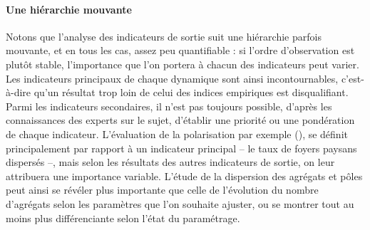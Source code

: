 \documentclass[12pt, a4paper, oneside]{book}
\begin{document}
	\paragraph{Une hiérarchie mouvante}
	Notons que l'analyse des indicateurs de sortie suit une hiérarchie parfois mouvante, et en tous les cas, assez peu quantifiable : si l'ordre d'observation est plutôt stable, l'importance que l'on portera à chacun des indicateurs peut varier.
	Les indicateurs principaux de chaque dynamique sont ainsi \og incontournables\fg{}, c'est-à-dire qu'un résultat trop loin de celui des indices empiriques est disqualifiant.
	Parmi les indicateurs secondaires, il n'est pas toujours possible, d'après les connaissances des experts sur le sujet, d'établir une priorité ou une pondération de chaque indicateur. L'évaluation de la polarisation par exemple (), se définit principalement par rapport à un indicateur principal -- le taux de foyers paysans dispersés --, mais selon les résultats des autres indicateurs de sortie, on leur attribuera une importance variable. L'étude de la dispersion des agrégats et pôles peut ainsi se révéler plus importante que celle de l'évolution du nombre d'agrégats selon les paramètres que l'on souhaite ajuster, ou se montrer tout au moins plus différenciante selon l'état du paramétrage.
	
\end{document}
